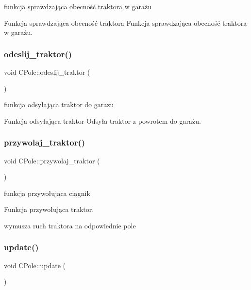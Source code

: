 funkcja sprawdzająca obecność traktora w garażu 

Funkcja sprawdzająca obecność traktora Funkcja sprawdzająca obecność traktora w garażu. \mbox{\label{class_c_pole_abfd3ba6eda25112d187886928a390e18}} 
\subsubsection{\texorpdfstring{odeslij\+\_\+traktor()}{odeslij\_traktor()}}
{\footnotesize\ttfamily void C\+Pole\+::odeslij\+\_\+traktor (\begin{DoxyParamCaption}{ }\end{DoxyParamCaption})}



funkcja odsyłająca traktor do garazu 

Funkcja odsyłająca traktor Odsyła traktor z powrotem do garażu. \mbox{\label{class_c_pole_ad55d0b7e22aa43541acfa150ffbaa655}} 
\subsubsection{\texorpdfstring{przywolaj\+\_\+traktor()}{przywolaj\_traktor()}}
{\footnotesize\ttfamily void C\+Pole\+::przywolaj\+\_\+traktor (\begin{DoxyParamCaption}{ }\end{DoxyParamCaption})}



funkcja przywołująca ciągnik 

Funkcja przywołująca traktor.

wymusza ruch traktora na odpowiednie pole \mbox{\label{class_c_pole_a29afebef6f17a729f4b4aabaad1dc41d}} 
\subsubsection{\texorpdfstring{update()}{update()}}
{\footnotesize\ttfamily void C\+Pole\+::update (\begin{DoxyParamCaption}{ }\end{DoxyParamCaption})\hspace{0.3cm}{\ttfamily [virtual]}}



